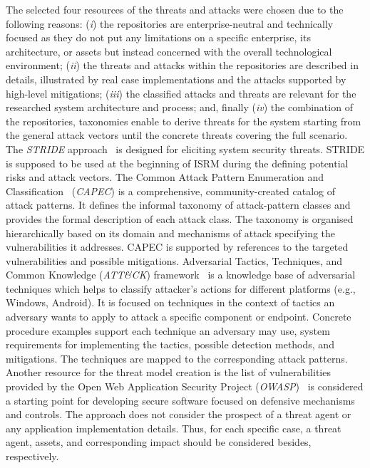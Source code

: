 \documentclass[manuscript]{acmart}
\begin{document}
The selected four resources of the threats and attacks were chosen due to the following reasons: (\textit{i}) 
the repositories are enterprise-neutral and technically focused as they do not put any limitations on a specific enterprise, its architecture, or assets but instead concerned with the overall technological environment; (\textit{ii}) the threats and attacks within the repositories are described in details, illustrated by real case implementations and the attacks supported by high-level mitigations; (\textit{iii}) the classified attacks and threats are relevant for the researched system architecture and process; and, finally (\textit{iv}) the combination of the repositories, taxonomies enable to derive threats for the system starting from the general attack vectors until the concrete threats covering the full scenario.
The \textit{STRIDE} approach~\cite{Stride} is designed for eliciting system security threats. STRIDE is supposed to be used at the beginning of ISRM during the defining potential risks and attack vectors. 
The Common Attack Pattern Enumeration and Classification~\cite{Capec} (\textit{CAPEC}) is a comprehensive, community-created catalog of attack patterns. It defines the informal taxonomy of attack-pattern classes and provides the formal description of each attack class. The taxonomy is organised hierarchically based on its domain and mechanisms of attack specifying the vulnerabilities it addresses. CAPEC is supported by references to the targeted vulnerabilities and possible mitigations.
Adversarial Tactics, Techniques, and Common Knowledge (\textit{ATT\&CK}) framework~\cite{Mitre_ATT_CK} is a knowledge base of adversarial techniques which helps to classify attacker's actions for different platforms (e.g., Windows, Android). 
It is focused on techniques in the context of tactics an adversary wants to apply to attack a specific component or endpoint. Concrete procedure examples support each technique an adversary may use, system requirements for implementing the tactics, possible detection methods, and mitigations. The techniques are mapped to the corresponding attack patterns. Another resource for the threat model creation is the list of vulnerabilities provided by the Open Web Application Security Project (\textit{OWASP})~\cite{OWASP_webPage} is considered a starting point for developing secure software focused on defensive mechanisms and controls.
The approach does not consider the prospect of a threat agent or any application implementation details.  
Thus, for each specific case, a threat agent, assets, and corresponding impact should be considered besides, respectively.
\end{document}
